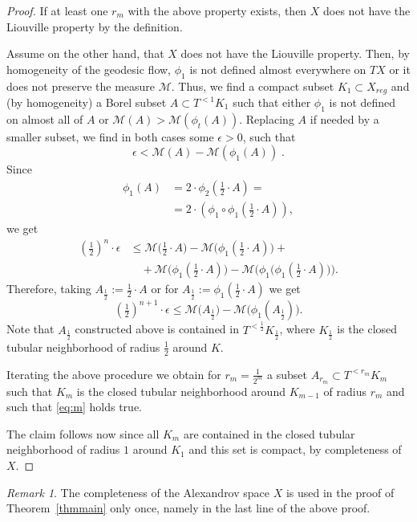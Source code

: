 \documentclass[12pt,leqno,intlimits]{amsart}
\numberwithin{equation}{section}
\theoremstyle{definition}
\theoremstyle{remark}
\newtheorem{rem}[thm]{Remark}
\newcommand{\tref}[1]{Theorem~\ref{#1}}
\begin{document}
\begin{proof}
If at least one $r_m$ with the above property exists, then $X$  does not have the Liouville property by the definition.

Assume on the other hand, that $X$ does not have the Liouville property. Then,  by homogeneity of the geodesic flow,  $\phi _1$ is not defined almost everywhere on $TX$ or it does not preserve the measure $\mathcal M$. Thus, we find a compact subset $K_1\subset X_{reg}$ and (by homogeneity) a Borel subset $A\subset T^{<1} K_1$ such that either $\phi_1$ is not defined on almost all of $A$ or $\mathcal M (A) > \mathcal M(\phi_t (A))$.  
Replacing $A$
if needed by a smaller  subset, we find in both cases some $\epsilon >0$, such that   $$\epsilon < \mathcal M (A) - \mathcal M(\phi_1 (A)) \; .$$
Since 
\begin{align*}
\phi_1 (A)&=2\cdot \phi _2 (\tfrac 1 2 \cdot A )=
\\
&=2\cdot(\phi _1 \circ \phi_1 (\tfrac 1 2 \cdot A ) ),
\end{align*}
we get
\begin{align*}
(\tfrac 1 2)^n \cdot \epsilon &\leq  \mathcal M \big(\tfrac 1 2\cdot  A \big) - \mathcal M \big( \phi_1 (\tfrac 1 2\cdot  A ) \big) + 
\\
&\quad+\mathcal M \big(\phi_1 (\tfrac 1 2\cdot  A )\big)
 - \mathcal M\big (\phi_1 \big (\phi _1 (\tfrac 1 2\cdot  A )\big) \big).
\end{align*}
Therefore,  taking $A_{\frac 1 2} := \frac 1 2  \cdot A$ or for $A_{\frac 1 2} := \phi_1 (\frac 1 2 \cdot A)$ we get
$$(\tfrac 1 2 )^{n+1} \cdot \epsilon  \le \mathcal M \big(A _{\frac 1 2} \big) - \mathcal M \big( \phi_1 (A _{\frac 1 2}) \big).$$
Note that $A_{\frac 1 2}$ constructed above is contained in $T^{<\frac 1 2} K_{\frac 1 2}$, where $K _{\frac 1 2}$ is the closed tubular neighborhood  of
radius $\frac 1 2$ around $K$.

Iterating the above procedure we obtain  for $r_m =\frac 1 {2^m}$   a subset $A_{r_m} \subset T^{<r_m} K_m$  such that $K_m$ is the closed tubular neighborhood around $K_{m-1}$ of radius $r_m$ and such that \eqref{eq:m} holds true.  

The claim follows now since all $K_m$ are contained in the closed tubular neighborhood of radius $1$ around $K_1$ and this set is compact, by completeness of $X$.
\end{proof}


\begin{rem}
The completeness of the Alexandrov space $X$ is used in the proof of \tref{thmmain} only once, namely in the last line of the above proof.
\end{rem}
\end{document}
